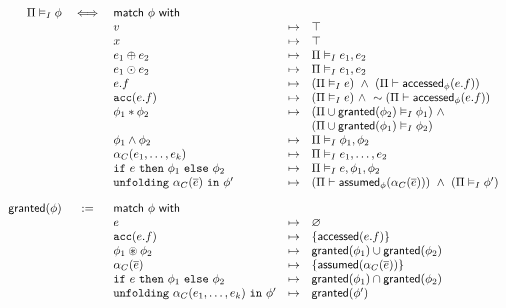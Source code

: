 \begin{align*}
\begin{array}{rclcl}
\Pi \frames \phi &\iff& \tsf{match} \ \phi \ \tsf{with} &&
\\
&& v &\mt&
  \top
\\
&& x &\mt&
  \top
\\
&& e_1 \oplus e_2 &\mt&
  \Pi \frames e_1, e_2
\\
&& e_1 \odot e_2 &\mt&
  \Pi \frames e_1, e_2
\\
&& e.f &\mt&
  (\Pi \frames e) \ \land \ (\Pi \entails \accessed_\phi(e.f))
\\
&& \cacc(e.f) &\mt&
  (\Pi \frames e)  \ \land \
  \pnot (\Pi \entails \accessed_\phi(e.f))
\\
&& \phi_1 \ast \phi_2 &\mt&
  (\Pi \cup \granted(\phi_2) \frames \phi_1) \ \land \\ &&&&
  (\Pi \cup \granted(\phi_1) \frames \phi_2)
\\
&& \phi_1 \land \phi_2 &\mt&
  \Pi \frames \phi_1, \phi_2
\\
&& \alpha_C(e_1, \dots, e_k) &\mt&
  \Pi \frames e_1, \dots, e_2
\\
&& \cif \ e \ \cthen \ \phi_1 \ \celse \ \phi_2 &\mt&
  \Pi \frames e, \phi_1, \phi_2
\\
&& \cunfolding \ \alpha_C(\vec{e}) \ \cin \ \phi\p &\mt&
  (\Pi \entails \assumed_\phi(\alpha_C(\vec{e}))) \ \land \
  (\Pi \frames \phi\p)
%
\\[1em]
%
\granted(\phi) &:=& \tsf{match} \ \phi \ \tsf{with} &&
\\
&& e &\mt&
  \empty
\\
&& \cacc(e.f) &\mt&
  \set{ \accessed(e.f) }
\\
&& \phi_1 \oast \phi_2 &\mt&
  \granted(\phi_1) \cup \granted(\phi_2)
\\
&& \alpha_C(\vec{e}) &\mt&
  \set{ \assumed(\alpha_C(\vec{e})) }
\\
&& \cif \ e \ \cthen \ \phi_1 \ \celse \ \phi_2 &\mt&
  \granted(\phi_1) \cap \granted(\phi_2)
\\
&& \cunfolding \ \alpha_C(e_1, \dots, e_k) \ \cin \ \phi\p &\mt&
  \granted(\phi\p)
\end{array}
\end{align*}

